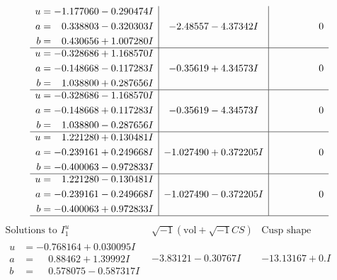 \documentclass[1p]{elsarticle_modified}
\theoremstyle{definition}
\newcommand{\I}{\sqrt{-1}}
\begin{document}
$$\begin{array}{c|c|c}
\begin{aligned}
u &= -1.177060 - 0.290474 I \\
a &= \phantom{-}0.338803 - 0.320303 I \\
b &= \phantom{-}0.430656 + 1.007280 I\end{aligned}
 & -2.48557 - 4.37342 I & \phantom{-0.000000 } 0 \\ \hline\begin{aligned}
u &= -0.328686 + 1.168570 I \\
a &= -0.148668 - 0.117283 I \\
b &= \phantom{-}1.038800 + 0.287656 I\end{aligned}
 & -0.35619 + 4.34573 I & \phantom{-0.000000 } 0 \\ \hline\begin{aligned}
u &= -0.328686 - 1.168570 I \\
a &= -0.148668 + 0.117283 I \\
b &= \phantom{-}1.038800 - 0.287656 I\end{aligned}
 & -0.35619 - 4.34573 I & \phantom{-0.000000 } 0 \\ \hline\begin{aligned}
u &= \phantom{-}1.221280 + 0.130481 I \\
a &= -0.239161 + 0.249668 I \\
b &= -0.400063 - 0.972833 I\end{aligned}
 & -1.027490 + 0.372205 I & \phantom{-0.000000 } 0 \\ \hline\begin{aligned}
u &= \phantom{-}1.221280 - 0.130481 I \\
a &= -0.239161 - 0.249668 I \\
b &= -0.400063 + 0.972833 I\end{aligned}
 & -1.027490 - 0.372205 I & \phantom{-0.000000 } 0\\
 \hline 
 \end{array}$$\newpage$$\begin{array}{c|c|c}  
\text{Solutions to }I^u_{1}& \I (\text{vol} + \sqrt{-1}CS) & \text{Cusp shape}\\
 \hline 
\begin{aligned}
u &= -0.768164 + 0.030095 I \\
a &= \phantom{-}0.88462 + 1.39992 I \\
b &= \phantom{-}0.578075 - 0.587317 I\end{aligned}
 & -3.83121 - 0.30767 I & -13.13167 + 0. I\phantom{ +0.000000I} \\ \hline\begin{aligned}

\end{aligned}
\end{array}$$
\end{document}
